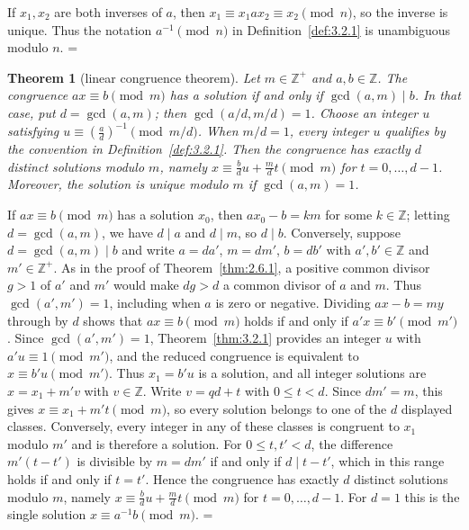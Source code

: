 \documentclass[11pt]{article}
\makeatletter
\let\nt@closedisplay\]
\def\nt@guardedclose{\@ifnextchar\par{\nt@closeafterpar}{\@ifnextchar\end{\postdisplaypenalty\@M\nt@closedisplay}{\nt@closedisplay}}}
\def\nt@closeafterpar\par{\@ifnextchar\par{\nt@closeafterpar}{\@ifnextchar\end{\postdisplaypenalty\@M\nt@closedisplay\par}{\nt@closedisplay\par}}}
\renewenvironment{proof}[1][\proofname]{\par
  \pushQED{\qed}\normalfont\topsep\medskipamount\edef\nt@afterproof{\@endparpenalty=\the\@endparpenalty\relax}\@beginparpenalty\@M\@endparpenalty\@M\let\]\nt@guardedclose\trivlist\item[]\textit{#1\@addpunct{.}} \ignorespaces}{\ifvmode\addpenalty\@M\fi\popQED\nt@afterproof\endtrivlist\@endpefalse}
\theoremstyle{ntstyle}
\newtheorem{theorem}{Theorem}[subsection]
\makeatother
\begin{document}
\begin{proof} If $x_1, x_2$ are both inverses of $a$,
  then $x_1 \equiv x_1 a x_2 \equiv x_2 \pmod{n}$, so the inverse is
  unique. Thus the notation $a^{-1} \pmod{n}$ in Definition~\ref{def:3.2.1} is
  unambiguous modulo $n$.
\end{proof}

\begin{theorem}[linear congruence theorem]\label{thm:3.2.3}\label{thm:linear-congruence-theorem}
  Let $m \in \mathbb{Z}^+$ and $a, b \in \mathbb{Z}$. The congruence $ax \equiv b \pmod{m}$ has a solution if and
  only if $\gcd(a, m) \mid b$.
  In that case, put $d=\gcd(a,m)$; then $\gcd(a/d,m/d)=1$.
  Choose an integer $u$ satisfying
  $u\equiv(\tfrac{a}{d})^{-1}\pmod{m/d}$.
  When $m/d=1$, every integer $u$ qualifies by the convention in
  Definition~\ref{def:3.2.1}. Then the congruence has exactly $d$
  distinct solutions modulo $m$, namely
  $x\equiv\tfrac{b}{d}u+\tfrac{m}{d}t\pmod{m}$ for
  $t=0,\ldots,d-1$.
  Moreover, the solution is unique modulo $m$ if $\gcd(a, m) = 1$.

\end{theorem}

\begin{proof} If $ax \equiv b \pmod{m}$ has a solution
  $x_0$, then $ax_0 - b = km$ for some $k \in \mathbb{Z}$; letting $d = \gcd(a, m)$, we have $d \mid a$ and
  $d \mid m$, so $d \mid b$. Conversely,
  suppose $d = \gcd(a, m) \mid b$ and write $a = d a'$, $m = d m'$, $b = d b'$ with $a',b'\in\mathbb{Z}$ and
  $m'\in\mathbb{Z}^+$.
  As in the proof of Theorem~\ref{thm:2.6.1}, a positive common divisor
  $g>1$ of $a'$ and $m'$ would make $dg>d$ a common divisor of $a$ and $m$.
  Thus $\gcd(a',m')=1$, including when $a$ is zero or negative.
  Dividing $ax - b = my$ through by $d$ shows that
  $ax \equiv b \pmod{m}$ holds if and only if $a' x \equiv b' \pmod{m'}$. Since $\gcd(a', m') = 1$,
  Theorem~\ref{thm:3.2.1} provides an integer
  $u$ with $a' u \equiv 1 \pmod{m'}$, and the reduced congruence is
  equivalent to $x \equiv b'u \pmod{m'}$. Thus $x_1=b'u$ is a solution,
  and all integer solutions are $x=x_1+m'v$ with $v\in\mathbb{Z}$.
  Write $v=qd+t$ with $0\le t<d$. Since $dm'=m$, this gives
  $x\equiv x_1+m't\pmod{m}$, so every solution belongs to one of the
  $d$ displayed classes. Conversely, every integer in any of these
  classes is congruent to $x_1$ modulo $m'$ and is therefore a solution.
  For $0\le t,t'<d$, the difference $m'(t-t')$ is divisible by
  $m=dm'$ if and only if $d\mid t-t'$, which in this range holds
  if and only if $t=t'$. Hence the congruence has exactly $d$ distinct
  solutions modulo $m$, namely
  $x\equiv\tfrac{b}{d}u+\tfrac{m}{d}t\pmod{m}$ for $t=0,\ldots,d-1$.
  For $d=1$ this is the single solution $x\equiv a^{-1}b\pmod{m}$.
\end{proof}
\end{document}
